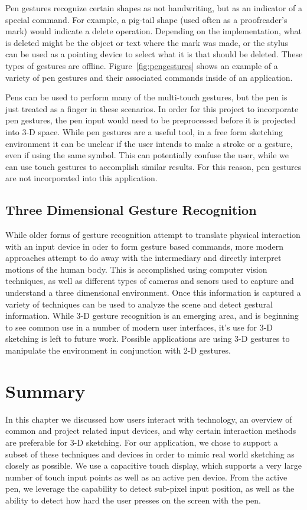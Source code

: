 Pen gestures recognize certain shapes as not handwriting, but as an indicator of a special command.
For example, a pig-tail shape (used often as a proofreader's mark) would indicate a delete operation. 
Depending on the implementation, what is deleted might be the object or text where the mark was made, or the stylus can be used as a pointing device to select what it is that should be deleted.
These types of gestures are offline.
Figure~\ref{fig:pengestures} shows an example of a variety of pen gestures and their associated commands inside of an application.

Pens can be used to perform many of the multi-touch gestures, but the pen is just treated as a finger in these scenarios.
In order for this project to incorporate pen gestures, the pen input would need to be preprocessed before it is projected into 3-D space.
While pen gestures are a useful tool, in a free form sketching environment it can be unclear if the user intends to make a stroke or a gesture, even if using the same symbol.
This can potentially confuse the user, while we can use touch gestures to accomplish similar results.
For this reason, pen gestures are not incorporated into this application.




\subsection{Three Dimensional Gesture Recognition}

While older forms of gesture recognition attempt to translate physical interaction with an input device in oder to form gesture based commands, more modern approaches attempt to do away with the intermediary and directly interpret motions of the human body.
This is accomplished using computer vision techniques, as well as different types of cameras and senors used to capture and understand a three dimensional environment.
Once this information is captured a variety of techniques can be used to analyze the scene and detect gestural information. 
While 3-D gesture recognition is an emerging area, and is beginning to see common use in a number of modern user interfaces, it's use for 3-D sketching is left to future work.
Possible applications are using 3-D gestures to manipulate the environment in conjunction with 2-D gestures.

\section{Summary}
In this chapter we discussed how users interact with technology, an overview of common and project related input devices, and why certain interaction methods are preferable for 3-D sketching.
For our application, we chose to support a subset of these techniques and devices in order to mimic real world sketching as closely as possible.
We use a capacitive touch display, which supports a very large number of touch input points as well as an active pen device.
From the active pen, we leverage the capability to detect sub-pixel input position, as well as the ability to detect how hard the user presses on the screen with the pen.